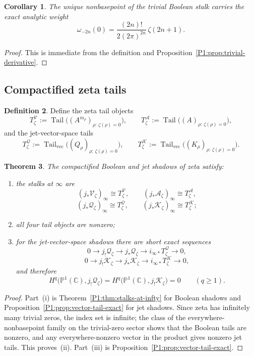 \documentclass[11pt,a4paper]{article}
\numberwithin{equation}{section}
\newtheorem{theorem}{Theorem}[section]
\newtheorem{corollary}[theorem]{Corollary}
\theoremstyle{definition}
\newtheorem{definition}[theorem]{Definition}
\theoremstyle{remark}
\DeclareMathOperator{\Tail}{Tail}
\newcommand{\CC}{\mathbb C}
\newcommand{\PP}{\mathbb P}
\newcommand{\cV}{\mathcal V}
\newcommand{\cA}{\mathcal A}
\newcommand{\cQ}{\mathcal Q}
\newcommand{\cK}{\mathcal K}
\begin{document}
\begin{corollary}\label{P1:cor:trivial-weight}
The unique nonbasepoint of the trivial Boolean stalk carries the exact analytic weight
\[
\omega_{-2n}(0)=\frac{(2n)!}{2(2\pi)^{2n}}\,\zeta(2n+1).
\]
\end{corollary}

\begin{proof}
This is immediate from the definition and Proposition~\ref{P1:prop:trivial-derivative}.
\end{proof}

\subsection{Compactified zeta tails}

\begin{definition}
Define the zeta tail objects
\[
T_\zeta^{\cV}:=\Tail\bigl((A^{m_\rho})_{\rho:\,\zeta(\rho)=0}\bigr),
\qquad
T_\zeta^{\cA}:=\Tail\bigl((A)_{\rho:\,\zeta(\rho)=0}\bigr),
\]
and the jet-vector-space tails
\[
T_\zeta^{\cQ}:=\Tail_{\mathrm{vec}}\bigl((Q_\rho)_{\rho:\,\zeta(\rho)=0}\bigr),
\qquad
T_\zeta^{\cK}:=\Tail_{\mathrm{vec}}\bigl((K_\rho)_{\rho:\,\zeta(\rho)=0}\bigr).
\]
\end{definition}

\begin{theorem}\label{P1:thm:zeta-tail}
The compactified Boolean and jet shadows of zeta satisfy:
\begin{enumerate}[label=(\roman*)]
\item the stalks at $\infty$ are
\[
(j_*\cV_\zeta)_\infty\cong T_\zeta^{\cV},
\qquad
(j_*\cA_\zeta)_\infty\cong T_\zeta^{\cA},
\]
\[
(j_*\cQ_\zeta)_\infty\cong T_\zeta^{\cQ},
\qquad
(j_*\cK_\zeta)_\infty\cong T_\zeta^{\cK};
\]
\item all four tail objects are nonzero;
\item for the jet-vector-space shadows there are short exact sequences
\[
0\to j_!\cQ_\zeta\to j_*\cQ_\zeta\to i_{\infty*}T_\zeta^{\cQ}\to0,
\]
\[
0\to j_!\cK_\zeta\to j_*\cK_\zeta\to i_{\infty*}T_\zeta^{\cK}\to0,
\]
and therefore
\[
H^q\bigl(\PP^1(\CC),j_!\cQ_\zeta\bigr)=H^q\bigl(\PP^1(\CC),j_!\cK_\zeta\bigr)=0
\qquad(q\ge1).
\]
\end{enumerate}
\end{theorem}

\begin{proof}
Part~(i) is Theorem~\ref{P1:thm:stalks-at-infty} for Boolean shadows and Proposition~\ref{P1:prop:vector-tail-exact} for jet shadows.  Since zeta has infinitely many trivial zeros, the index set is infinite; the class of the everywhere-nonbasepoint family on the trivial-zero sector shows that the Boolean tails are nonzero, and any everywhere-nonzero vector in the product gives nonzero jet tails.  This proves~(ii).  Part~(iii) is Proposition~\ref{P1:prop:vector-tail-exact}.
\end{proof}
\end{document}
